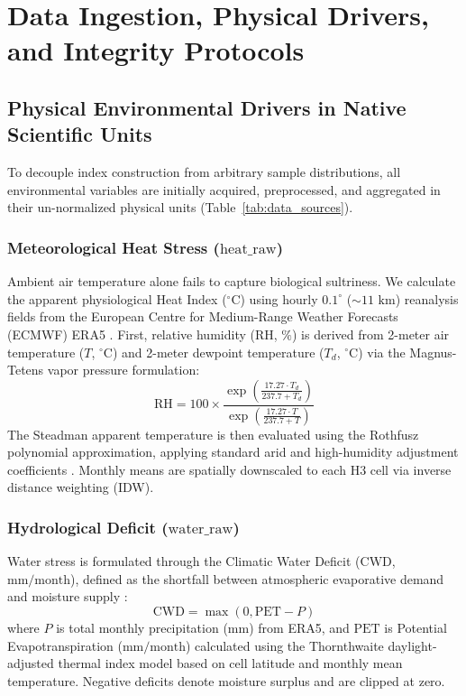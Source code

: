 \section{Data Ingestion, Physical Drivers, and Integrity Protocols}
\label{sec:data}

\subsection{Physical Environmental Drivers in Native Scientific Units}
To decouple index construction from arbitrary sample distributions, all environmental variables are initially acquired, preprocessed, and aggregated in their un-normalized physical units (Table~\ref{tab:data_sources}).



\subsubsection{Meteorological Heat Stress \texorpdfstring{($\text{heat\_raw}$)}{(heat\_raw)}}
Ambient air temperature alone fails to capture biological sultriness. We calculate the apparent physiological Heat Index ($^\circ\text{C}$) using hourly $0.1^\circ$ ($\sim 11\text{ km}$) reanalysis fields from the European Centre for Medium-Range Weather Forecasts (ECMWF) ERA5 \citep{hersbach2020era5}. First, relative humidity ($\text{RH}$, $\%$) is derived from 2-meter air temperature ($T$, $^\circ\text{C}$) and 2-meter dewpoint temperature ($T_d$, $^\circ\text{C}$) via the Magnus-Tetens vapor pressure formulation:
\begin{equation}
    \text{RH} = 100 \times \frac{\exp\left(\frac{17.27 \cdot T_d}{237.7 + T_d}\right)}{\exp\left(\frac{17.27 \cdot T}{237.7 + T}\right)}
\end{equation}
The Steadman apparent temperature is then evaluated using the Rothfusz polynomial approximation, applying standard arid and high-humidity adjustment coefficients \citep{steadman1979assessment, rothfusz1990heat}. Monthly means are spatially downscaled to each H3 cell via inverse distance weighting (IDW).

\subsubsection{Hydrological Deficit \texorpdfstring{($\text{water\_raw}$)}{(water\_raw)}}
Water stress is formulated through the Climatic Water Deficit ($\text{CWD}$, $\text{mm}/\text{month}$), defined as the shortfall between atmospheric evaporative demand and moisture supply \citep{thornthwaite1948approach}:
\begin{equation}
    \text{CWD} = \max\left(0, \text{PET} - P\right)
\end{equation}
where $P$ is total monthly precipitation ($\text{mm}$) from ERA5, and $\text{PET}$ is Potential Evapotranspiration ($\text{mm}/\text{month}$) calculated using the Thornthwaite daylight-adjusted thermal index model based on cell latitude and monthly mean temperature. Negative deficits denote moisture surplus and are clipped at zero.

